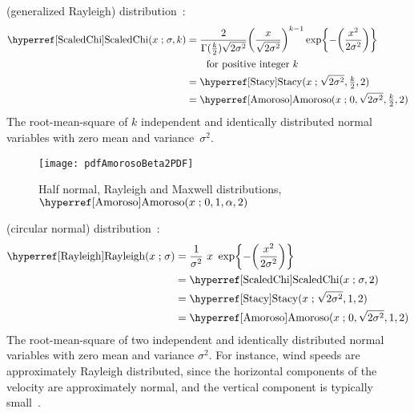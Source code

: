  (generalized Rayleigh) distribution~\cite{Miller1964,Johnson1994}:
\begin{align}
\opr{ScaledChi}(x \given \sigma, k) 
&= \frac{2}{\Gamma(\tfrac{k}{2}) \sqrt{2\sigma^2}} { \Left(\frac{x}{\sqrt{2\sigma^2}}\Right)}^{k-1} 
\exp\Left\{-\Left(\frac{x^2}{2\sigma^2}\Right)\Right\} 
\notag \checked
\\
& \qquad \text{for positive integer } k \notag \checked \\
&=  \opr{Stacy}(x\given \sqrt{2\sigma^2}, \tfrac{k}{2},2)  \checked
\label{ScaledChi}
\\
&=  \opr{Amoroso}(x \given 0, \sqrt{2\sigma^2}, \tfrac{k}{2}, 2) \checked
\notag 
\end{align}
The root-mean-square of $k$ independent and identically distributed normal variables with zero mean and variance~$\sigma^2$. 


\begin{figure}[t]
\begin{center}
\texttt{[image: pdfAmorosoBeta2PDF]}
\end{center}
\caption[Half normal, Rayleigh and Maxwell distributions]{Half normal, Rayleigh and Maxwell distributions, $\opr{Amoroso}(x\given 0,1,\alpha,2)$}
\end{figure}



 (circular normal) distribution~\cite{Strutt1880,Johnson1994}:
%
\begin{align}
\label{Rayleigh}
\opr{Rayleigh}(x \given \sigma) 
&= \frac{1}{\sigma^2 }\ x\  \exp\Left\{-\Left(\frac{x^2}{2 \sigma^2}\Right)\Right\}  \checked
\\
&=\opr{ScaledChi}(x \given \sigma, 2) \notag 							\checked \\
&=  \opr{Stacy}(x\given  \sqrt{2\sigma^2} ,1,2) \notag					\checked \\
&=  \opr{Amoroso}(x\given  0, \sqrt{2\sigma^2} , 1, 2) 					\checked \notag 
\end{align}
 The root-mean-square of two independent and identically distributed normal variables with zero mean and variance $\sigma^2$. 
 For instance, wind speeds are approximately Rayleigh distributed, since the horizontal components of the velocity are approximately normal, and the vertical component is typically small~\cite{Justus1978}. 


